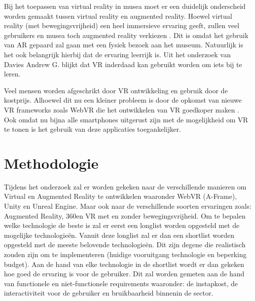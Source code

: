 Bij het toepassen van virtual reality in musea moet er een duidelijk onderscheid worden gemaakt tussen virtual reality en augmented reality. Hoewel virtual reality (met bewegingsvrijheid) een heel immersieve ervaring geeft, zullen veel gebruikers en musea toch augmented reality verkiezen \autocite{Kersten2017}. Dit is omdat het gebruik van AR gepaard zal gaan met een fysiek bezoek aan het museum. Natuurlijk is het ook belangrijk hierbij dat de ervaring leerrijk is. Uit het onderzoek van Davies Andrew G.\textcite{Davies2018} blijkt dat VR inderdaad kan gebruikt worden om iets bij te leren.

Veel mensen worden afgeschrikt door VR ontwikkeling en gebruik door de kostprijs. Alhoewel dit nu een kleiner probleem is door de opkomst van nieuwe VR frameworks zoals WebVR die het ontwikkelen van VR goedkoper maken \autocite{Dibbern2018}. Ook omdat nu bijna alle smartphones uitgerust zijn met de mogelijkheid om VR te tonen is het gebruik van deze applicaties toegankelijker.



\section{Methodologie}
\label{sec:methodologie}

Tijdens het onderzoek zal er worden gekeken naar de verschillende manieren om Virtual en Augmented Reality te ontwikkelen waaronder WebVR (A-Frame), Unity en Unreal Engine. Maar ook naar de verschillende soorten ervaringen zoals: Augmented Reality, 360\textdegree\space en VR met en zonder bewegingsvrijheid. 
Om te bepalen welke technologie de beste is zal er eerst een longlist worden opgesteld met de mogelijke technologieën. Vanuit deze longlist zal er dan een shortlist worden opgesteld met de meeste belovende technologieën. Dit zijn degene die realistisch zouden zijn om te implementeren (huidige vooruitgang technologie en beperking budget). Aan de hand van elke technologie in de shortlist wordt er dan gekeken hoe goed de ervaring is voor de gebruiker. Dit zal worden gemeten aan de hand van functionele en niet-functionele requirements waaronder: de instapkost, de interactiviteit voor de gebruiker en bruikbaarheid binnenin de sector.


